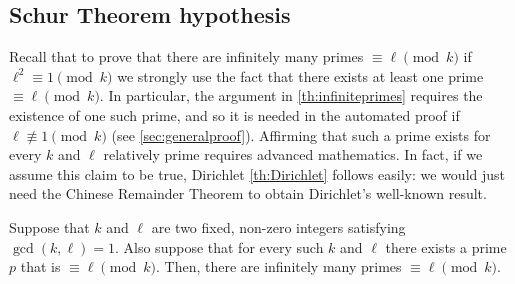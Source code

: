 \documentclass[../main.tex]{subfiles}
\begin{document}
\subsection{Schur Theorem hypothesis}\label{sec:thhypothesis}
Recall that to prove that there are infinitely many primes $\equiv\ell\pmod{k}$ if $\ell^2\equiv 1\pmod{k}$ we strongly use the fact that there exists at least one prime $\equiv\ell\pmod{k}$. In particular, the argument in \cref{th:infiniteprimes} requires the existence of one such prime, and so it is needed in the automated proof if $\ell\not\equiv 1 \pmod{k}$ (see \cref{sec:generalproof}). Affirming that such a prime exists for every $k$ and $\ell$ relatively prime requires advanced mathematics. In fact, if we assume this claim to be true, Dirichlet \cref{th:Dirichlet} follows easily: we would just need the Chinese Remainder Theorem to obtain Dirichlet's well-known result.
\begin{lemma}
	Suppose that $k$ and $\ell$ are two fixed, non-zero integers satisfying $\gcd(k, \ell)=1$. Also suppose that for every such $k$ and $\ell$ there exists a prime $p$ that is $\equiv\ell\pmod{k}$. Then, there are infinitely many primes $\equiv\ell\pmod{k}$.
\end{lemma}
\end{document}
